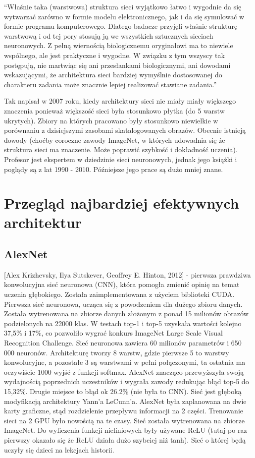 \documentclass[12pt,a4paper,twoside,titlepage,openright]{book}
\begin{document}
“Właśnie taka (warstwowa) struktura sieci wyjątkowo łatwo i wygodnie da się wytwarzać zarówno w formie modelu elektronicznego, jak i da się symulować w formie programu komputerowego. Dlatego badacze przyjęli właśnie strukturę warstwową i od tej pory stosują ją we wszystkich sztucznych sieciach neuronowych. Z pełną wiernością biologicznemu oryginałowi ma to niewiele wspólnego, ale jest praktyczne i wygodne. W związku z tym wszyscy tak postępują, nie martwiąc się ani przesłankami biologicznymi, ani dowodami wskazującymi, że architektura sieci bardziej wymyślnie dostosowanej do charakteru zadania może znacznie lepiej realizować stawiane zadania.”

Tak napisał w 2007 roku, kiedy architektury sieci nie miały miały większego znaczenia ponieważ większość sieci była stosunkowo płytka (do 5 warstw ukrytych). Zbiory na których pracowano były stosunkowo niewielkie w porównaniu z dzisiejszymi zasobami skatalogowanych obrazów. 
Obecnie istnieją dowody (choćby coroczne zawody ImageNet, w których udowadnia się że struktura sieci ma znaczenie. Może poprawić szybkość i dokładność uczenia). Profesor jest ekspertem w dziedzinie sieci neuronowych, jednak jego książki i poglądy są z lat 1990 - 2010. Późniejsze jego prace są dużo mniej znane.

\section{Przegląd najbardziej efektywnych architektur}

\subsection{AlexNet}
 [Alex Krizhevsky, Ilya Sutskever, Geoffrey E. Hinton, 2012] - pierwsza prawdziwa konwolucyjna sieć neuronowa (CNN), która pomogła zmienić opinię na temat uczenia głębokiego. Została zaimplementowana z użyciem biblioteki CUDA. Pierwsza sieć neuronowa, ucząca się z powodzeniem dla dużego zbioru danych.
 Została wytrenowana na zbiorze danych złożonym z ponad 15 milionów obrazów podzielonych na 22000 klas. 
 W testach top-1 i top-5 uzyskała wartości kolejno 37,5\% i 17\%, co pozwoliło wygrać konkurs ImageNet Large Scale Visual Recognition Challenge. 
 Sieć neuronowa zawiera 60 milionów parametrów i 650 000 neuronów. Architekturę tworzy 8 warstw, gdzie pierwsze 5 to warstwy konwolucyjne, a pozostałe 3 są warstwami w pełni połączonymi, ta ostatnia ma oczywiście 1000 wyjść z funkcji softmax. AlexNet znacząco przewyższyła swoją wydajnością poprzednich uczestników i wygrała zawody redukując błąd top-5 do 15,32\%. Drugie miejsce to błąd ok 26.2\% (nie była to CNN). Sieć jest głęboką modyfikacją architektury Yann’a LeCunn’a. AlexNet była zaplanowana na dwie karty graficzne, stąd rozdzielenie przepływu informacji na 2 części. Trenowanie sieci na 2 GPU było nowością na te czasy. Sieć została wytrenowana na zbiorze ImageNet. Do wyliczenia funkcji nieliniowych były używane ReLU (tutaj po raz pierwszy okazało się że ReLU działa dużo szybciej niż tanh). Sieć o której będą uczyły się dzieci na lekcjach historii. \cite{NIPS2012_4824}
\end{document}
